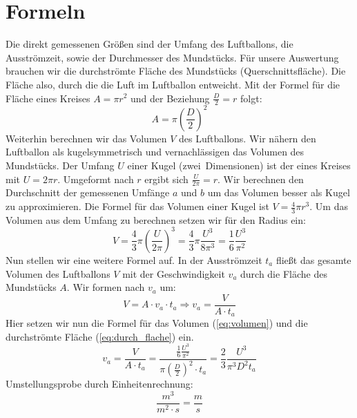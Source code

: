 \documentclass{article}
\begin{document}
    \section{Formeln}
    Die direkt gemessenen Größen sind der Umfang des Luftballons, die Ausströmzeit, sowie der Durchmesser des Mundstücks.
    Für unsere Auswertung brauchen wir die durchströmte Fläche des Mundstücks (Querschnittsfläche).
    Die Fläche also, durch die die Luft im Luftballon entweicht.
    Mit der Formel für die Fläche eines Kreises \( A = \pi {r}^2 \) und der Beziehung \( \frac{D}{2} = r\) folgt:
    \begin{equation} \label{eq:durch_flache}
        A = \pi {\left( \frac{D}{2} \right)}^2
    \end{equation}
    Weiterhin berechnen wir das Volumen \(V\) des Luftballons.
    Wir nähern den Luftballon als kugelsymmetrisch und vernachlässigen das Volumen des Mundstücks.
    Der Umfang \(U\) einer Kugel (zwei~Dimensionen) ist der eines Kreises mit \(U = 2 \pi r\). Umgeformt nach \(r\) ergibt sich \(\frac{U}{2 \pi} = r\).
    Wir berechnen den Durchschnitt der gemessenen Umfänge \(a\) und \(b\) um das Volumen besser als Kugel zu approximieren.
    Die Formel für das Volumen einer Kugel ist \( V = \frac{4}{3} \pi r^3 \).
    Um das Volumen aus dem Umfang zu berechnen setzen wir für den Radius ein:
    \begin{equation} \label{eq:volumen}
        V = \frac{4}{3} \pi {\left( \frac{U}{2 \pi} \right) }^3 = \frac{4}{3} \pi \frac{U^3}{8 \pi^3} = \frac{1}{6} \frac{U^3}{\pi^2}
    \end{equation}
    Nun stellen wir eine weitere Formel auf. In der Ausströmzeit \(t_a\) fließt das gesamte Volumen des Luftballons \(V\)
    mit der Geschwindigkeit \(v_a\) durch die Fläche des Mundstücks \(A\). Wir formen nach \(v_a\) um:
    \begin{equation} \label{eq:geschw_zeit_beziehung}
        V = A \cdot v_a \cdot t_a \Rightarrow v_a = \frac{V}{A \cdot t_a}
    \end{equation}
    Hier setzen wir nun die Formel für das Volumen (\ref{eq:volumen}) und die durchströmte Fläche (\ref{eq:durch_flache}) ein.
    \begin{equation} \label{eq:calc_velocity}
        v_a = \frac{V}{A \cdot t_a} = \frac{\frac{1}{6} \frac{U^3}{\pi^2} }{ \pi {\left(\frac{D}{2}\right)}^2 \cdot t_a} = \frac{2}{3} \frac{U^3}{\pi^3 D^2 t_a}
    \end{equation}
    Umstellungsprobe durch Einheitenrechnung:
    \begin{equation*}
        \unit{\frac{m^3}{m^2 \cdot s}} = \unit{\frac{m}{s}}
    \end{equation*}
\end{document}
